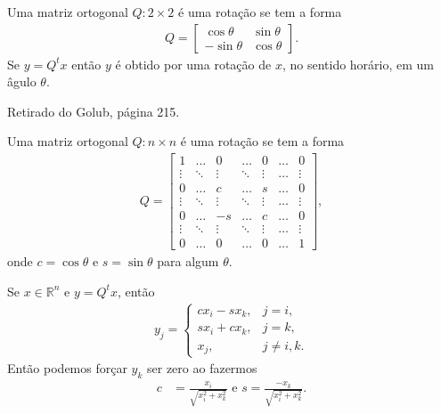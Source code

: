 \documentclass[a4paper,12pt, leqno, answers]{exam}
\begin{document}
\begin{questions}
\begin{solution}
        Uma matriz ortogonal $Q : 2 \times 2$ \'{e} uma rota\c{c}\~{a}o se tem a forma
        \begin{align*}
            Q = \begin{bmatrix}
                \cos \theta & \sin \theta \\
                -\sin \theta & \cos \theta
            \end{bmatrix}.
        \end{align*}
        Se $y = Q^t x$ ent\~{a}o $y$ \'{e} obtido por uma rota\c{c}\~{a}o de $x$, no sentido hor\'{a}rio, em um \^{a}gulo $\theta$.

        Retirado do Golub, p\'{a}gina 215.

        Uma matriz ortogonal $Q : n \times n$ \'{e} uma rota\c{c}\~{a}o se tem a forma
        \begin{align*}
            Q = \begin{bmatrix}
                1      & \ldots & 0      & \ldots & 0       & \ldots & 0       \\
                \vdots & \ddots & \vdots & \ddots & \vdots  & \ldots & \vdots  \\
                0      & \ldots & c      & \ldots &  s      & \ldots & 0       \\
                \vdots & \ddots & \vdots & \ddots & \vdots  & \ldots & \vdots  \\
                0      & \ldots & -s     & \ldots &  c      & \ldots & 0       \\
                \vdots & \ddots & \vdots & \ddots & \vdots  & \ldots & \vdots  \\
                0      & \ldots & 0      & \ldots & 0       & \ldots & 1 
            \end{bmatrix},
        \end{align*}
        onde $c = \cos \theta$ e $s = \sin \theta$ para algum $\theta$.

        Se $x \in \mathbb{R}^n$ e $y = Q^t x$, ent\~{a}o
        \begin{align*}
            y_j = \begin{cases}
                c x_i - s x_k, & j = i, \\
                s x_i + c x_k, & j = k, \\
                x_j, & j \neq i, k.
            \end{cases}
        \end{align*}
        Ent\~{a}o podemos for\c{c}ar $y_k$ ser zero ao fazermos
        \begin{align*}
            c &= \frac{x_i}{\sqrt{x_i^2 + x_k^2}} \text{ e } s = \frac{-x_k}{\sqrt{x_i^2 + x_k^2}}.
        \end{align*}
    \end{solution}


\end{questions}
\end{document}
